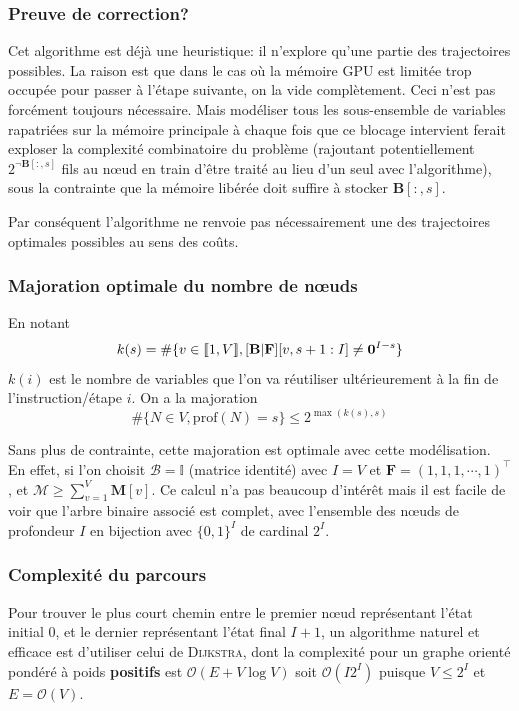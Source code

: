 \documentclass[svgnames,dvipsnames,a4paper,10pt,french]{report}
\begin{document}
\begin{appendices}
\subsubsection{Preuve de correction?}
Cet algorithme est déjà une heuristique: il n'explore qu'une partie des trajectoires possibles. La raison est que dans le cas où la mémoire GPU est limitée trop occupée pour passer à l'étape suivante, on la vide complètement. Ceci n'est pas forcément toujours nécessaire. Mais modéliser tous les sous-ensemble de variables rapatriées sur la mémoire principale à chaque fois que ce blocage intervient ferait exploser la complexité combinatoire du problème (rajoutant potentiellement $2^{\lnot \mathbf{B}[:,s]}$ fils au n\oe{}ud en train d'être traité au lieu d'un seul avec l'algorithme), sous la contrainte que la mémoire libérée doit suffire à stocker $\mathbf{B}[:,s]$.

Par conséquent l'algorithme ne renvoie pas nécessairement une des trajectoires optimales possibles au sens des coûts.
 
\subsubsection{Majoration optimale  du nombre de n\oe{}uds}



En notant 
\begin{equation}
    k(s) = \# \{v\in\llbracket 1, V \rrbracket, [\mathbf{B}|\mathbf{F}] [v, s+1 : I] \neq \mathbf{0}^{I-s} \}
\end{equation}
$k(i)$ est le nombre de variables que l'on va réutiliser ultérieurement à la fin de l'instruction/étape $i$.
On a la majoration
\begin{equation}
    \#\{N \in V, \mathrm{prof}(N) = s\} \le 2^{\max (k(s), s)}
\end{equation}

Sans plus de contrainte, cette majoration est optimale avec cette modélisation.
En effet, si l'on choisit $\mathcal{B} = \mathds{I}$ (matrice identité) avec $I=V$ et $\mathbf{F} = (1, 1, 1, \cdots, 1)^\intercal$, et $\mathcal{M} \ge \sum_{v=1}^V \mathbf{M}[v]$. Ce calcul n'a pas beaucoup d'intérêt mais il est facile de voir que l'arbre binaire associé est complet, avec l'ensemble des n\oe{}uds de profondeur $I$  en bijection avec $\{0,1\}^{I}$ de cardinal $2^I$.

\subsubsection{Complexité du parcours}
Pour trouver le plus court chemin entre le premier n\oe{}ud représentant l'état initial $0$, et le dernier représentant l'état final $I+1$, un algorithme naturel et efficace est d'utiliser celui de \textsc{Dijkstra}, dont la complexité pour un graphe orienté pondéré à poids \textbf{positifs} est $\mathcal{O}(E+V\log V)$ soit $\mathcal{O}(I2^I)$ puisque $V\le 2^I$ et $E =\mathcal{O}(V)$.




\end{appendices}
\end{document}
